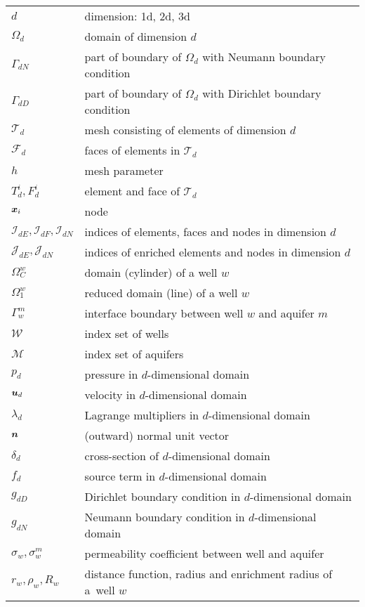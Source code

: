 \begin{tabularx}{0.9\linewidth}{@{}lX@{}}
$d$ & dimension: 1d, 2d, 3d \\
$\Omega_d$ & domain of dimension $d$ \\
$\Gamma_{dN}$ & part of boundary of $\Omega_d$ with Neumann boundary condition \\
$\Gamma_{dD}$ & part of boundary of $\Omega_d$ with Dirichlet boundary condition \\
$\mathcal T_d$ & mesh consisting of elements of dimension $d$ \\
$\mathcal F_d$ & faces of elements in $\mathcal T_d$ \\
$h$ & mesh parameter \\
$T^i_d, F^i_d$  & element and face of $\mathcal T_d$ \\
$\mathbf{\boldsymbol{x}}_i$ & node \\
$\mathcal I_{dE}, \mathcal I_{dF}, \mathcal I_{dN}$ & indices of elements, faces and nodes in dimension $d$ \\
$\mathcal J_{dE}, \mathcal J_{dN}$ & indices of enriched elements and nodes in dimension $d$ \\
$\Omega^w_C$ & domain (cylinder) of a well $w$ \\
$\Omega^w_1$ & reduced domain (line) of a well $w$ \\
$\Gamma^m_w$ & interface boundary between well $w$ and aquifer $m$ \\
$\mathcal W$ & index set of wells \\
$\mathcal M$ & index set of aquifers \\
$p_d$ & pressure in $d$-dimensional domain \\
$\mathbf{\boldsymbol{u}}_d$ & velocity in $d$-dimensional domain \\
$\lambda_d$ & Lagrange multipliers in $d$-dimensional domain \\
$\mathbf{\boldsymbol{n}}$ & (outward) normal unit vector \\
$\delta_d$ & cross-section of $d$-dimensional domain \\
$f_d$ & source term in $d$-dimensional domain \\
$g_{dD}$ & Dirichlet boundary condition in $d$-dimensional domain \\
$g_{dN}$ & Neumann boundary condition in $d$-dimensional domain \\
$\sigma_w, \sigma^m_w$ & permeability coefficient between well and aquifer \\
$r_w, \rho_w, R_w$ & distance function, radius and enrichment radius of a~well $w$ \\

\end{tabularx}
